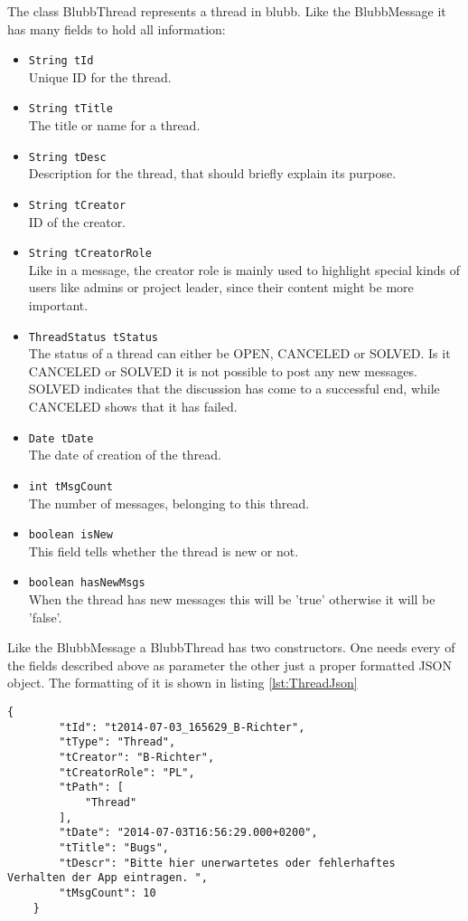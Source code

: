 \documentclass[12pt,a4paper,oneside]{report}
\newcommand{\appname}{blubb}
\newcommand{\code}[1]{\lstinline{#1}}
\begin{document}
The class BlubbThread represents a thread in \appname{}. Like the BlubbMessage it has many fields to hold all information:
\begin{itemize}
\item \code{String tId}\\
Unique ID for the thread.
\item \code{String tTitle}\\
The title or name for a thread.
\item \code{String tDesc}\\
Description for the thread, that should briefly explain its purpose.
\item \code{String tCreator}\\
ID of the creator.
\item \code{String tCreatorRole}\\
Like in a message, the creator role is mainly used to highlight special kinds of users like admins or project leader, since their content might be more important.
\item \code{ThreadStatus tStatus}\\
The status of a thread can either be OPEN, CANCELED or SOLVED. Is it CANCELED or SOLVED it is not possible to post any new messages. SOLVED indicates that the discussion has come to a successful end, while CANCELED shows that it has failed.
\item \code{Date tDate}\\
The date of creation of the thread.
\item \code{int tMsgCount}\\
The number of messages, belonging to this thread.
\item \code{boolean isNew}\\
This field tells whether the thread is new or not.
\item \code{boolean hasNewMsgs}\\
When the thread has new messages this will be 'true' otherwise it will be 'false'.

\end{itemize}

Like the BlubbMessage a BlubbThread has two constructors. One needs every of the fields described above as parameter the other just a proper formatted JSON object. The formatting of it is shown in listing \ref{lst:ThreadJson}

\begin{lstlisting}[caption=Thread JSON object, label=lst:ThreadJson]
{
        "tId": "t2014-07-03_165629_B-Richter",
        "tType": "Thread",
        "tCreator": "B-Richter",
        "tCreatorRole": "PL",
        "tPath": [
            "Thread"
        ],
        "tDate": "2014-07-03T16:56:29.000+0200",
        "tTitle": "Bugs",
        "tDescr": "Bitte hier unerwartetes oder fehlerhaftes 		Verhalten der App eintragen. ",
        "tMsgCount": 10
    }
\end{lstlisting}
\end{document}
